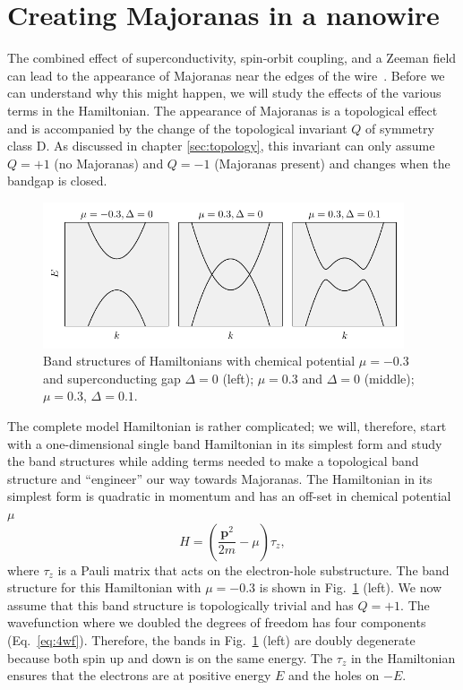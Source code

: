 \section{\label{sec:MBS}Creating Majoranas in a nanowire}

The combined effect of superconductivity, spin-orbit coupling, and a Zeeman field can lead to the appearance of Majoranas near the edges of the wire~\cite{Lutchyn2010,Oreg2010}.
Before we can understand why this might happen, we will study the effects of the various terms in the Hamiltonian.
The appearance of Majoranas is a topological effect and is accompanied by the change of the topological invariant $Q$ of symmetry class D.
As discussed in chapter \ref{sec:topology}, this invariant can only assume $Q=+1$ (no Majoranas) and $Q=-1$ (Majoranas present) and changes when the bandgap is closed.


\begin{figure}
\begin{centering}
\includegraphics[width=0.95\textwidth]{chapter_introduction/figures/triv_topo_bandstructure.pdf}
\par\end{centering}
\caption{Band structures of Hamiltonians with chemical potential $\mu=-0.3$
and superconducting gap $\Delta=0$ (left); $\mu=0.3$ and $\Delta=0$
(middle); $\mu=0.3$, $\Delta=0.1$.
\label{fig:triv_topo_bandstructure}}
\end{figure}

The complete model Hamiltonian is rather complicated; we will, therefore, start with a one-dimensional single band Hamiltonian in its simplest form and study the band structures while adding terms needed to make a topological band structure and ``engineer'' our way towards Majoranas.
The Hamiltonian in its simplest form is quadratic in momentum and has an off-set in chemical potential $\mu$  \begin{equation}
H=\left(\frac{\bm{p}^{2}}{2m}-\mu\right)\tau_{z},\label{eq:simple_ham}
\end{equation}
where $\tau_{z}$ is a Pauli matrix that acts on the electron-hole substructure.
The band structure for this Hamiltonian with $\mu=-0.3$ is shown in Fig.~\ref{fig:triv_topo_bandstructure} (left).
We now assume that this band structure is topologically trivial and has $Q=+1$.
The wavefunction where we doubled the degrees of freedom has four components (Eq.~\ref{eq:4wf}).
Therefore, the bands in Fig.~\ref{fig:triv_topo_bandstructure} (left) are doubly degenerate because both spin up and down is on the same energy.
The $\tau_{z}$ in the Hamiltonian ensures that the electrons are at positive energy $E$ and the holes on $-E$.



